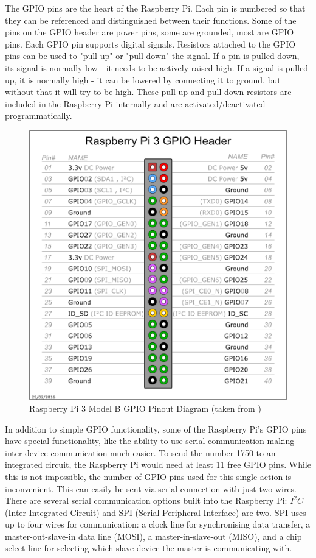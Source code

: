 \documentclass[twoside,a4]{report}
\def\br{\newline \newline \noindent}
\begin{document}
	\br
	The GPIO pins are the heart of the Raspberry Pi. Each pin is numbered so that they can be referenced and distinguished between their functions. Some of the pins on the GPIO header are power pins, some are grounded, most are GPIO pins. Each GPIO pin supports digital signals. Resistors attached to the GPIO pins can be used to "pull-up" or "pull-down" the signal. If a pin is pulled down, its signal is normally low - it needs to be actively raised high. If a signal is pulled up, it is normally high - it can be lowered by connecting it to ground, but without that it will try to be high. These pull-up and pull-down resistors are included in the Raspberry Pi internally and are activated/deactivated programmatically.
	
	\begin{figure}[!htb]
		\centering
		\includegraphics[scale=0.2]{images/gpiopinout.png}
		\caption{Raspberry Pi 3 Model B GPIO Pinout Diagram (taken from  \cite{pigpiopinout})}
		\label{gpiopinout}
	\end{figure}
	
	\noindent
	In addition to simple GPIO functionality, some of the Raspberry Pi's GPIO pins have special functionality, like the ability to use serial communication making inter-device communication much easier. To send the number 1750 to an integrated circuit, the Raspberry Pi would need at least 11 free GPIO pins. While this is not impossible, the number of GPIO pins used for this single action is inconvenient. This can easily be sent via serial connection with just two wires. There are several serial communication options built into the Raspberry Pi: $I^2C$ (Inter-Integrated Circuit) and SPI (Serial Peripheral Interface) are two. SPI uses up to four wires for communication: a clock line for synchronising data transfer, a master-out-slave-in data line (MOSI), a master-in-slave-out (MISO), %
	and a chip select line for selecting which slave device the master is communicating with.
	
\end{document}
